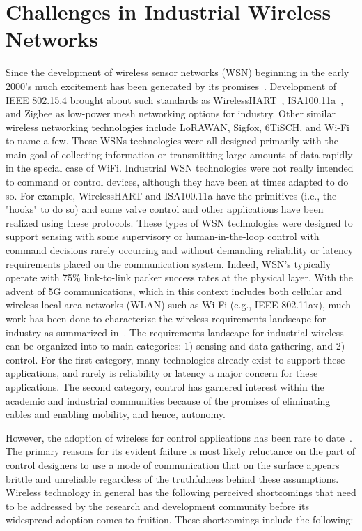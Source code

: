 \section{Challenges in Industrial Wireless Networks}
Since the development of wireless sensor networks (WSN) beginning in the early 2000's much excitement has been generated by its promises~\cite{OnWorld2014}.   Development of IEEE 802.15.4 brought about such standards as WirelessHART~\cite{Song2008}, ISA100.11a~\cite{ISA100.11a}, and Zigbee as low-power mesh networking options for industry.  Other similar wireless networking technologies include LoRAWAN, Sigfox, 6TiSCH, and Wi-Fi to name a few.  These WSNs technologies were all designed primarily with the main goal of collecting information or transmitting large amounts of data rapidly in the special case of WiFi.  Industrial WSN technologies were not really intended to command or control devices, although they have been at times adapted to do so.  For example, WirelessHART and ISA100.11a have the primitives (i.e., the "hooks" to do so) and some valve control and other applications have been realized using these protocols. These types of WSN technologies were designed to support sensing with some supervisory or human-in-the-loop control with command decisions rarely occurring and without demanding reliability or latency requirements placed on the communication system.  Indeed, WSN's typically operate with 75\% link-to-link packer success rates at the physical layer.  With the advent of 5G communications, which in this context includes both cellular and wireless local area networks (WLAN) such as Wi-Fi (e.g., IEEE 802.11ax), much work has been done to characterize the wireless requirements landscape for industry as summarized in~\cite{Montgomery2019}.  The requirements landscape for industrial wireless can be organized into to main categories: 1) sensing and data gathering, and 2) control.  For the first category, many technologies already exist to support these applications, and rarely is reliability or latency a major concern for these applications.  The second category, control has garnered interest within the academic and industrial communities because of the promises of eliminating cables and enabling mobility, and hence, autonomy.  

However, the adoption of wireless for control applications has been rare to date~\cite{Martinez2019}.  The primary reasons for its evident failure is most likely reluctance on the part of control designers to use a mode of communication that on the surface appears brittle and unreliable regardless of the truthfulness behind these assumptions.  Wireless technology in general has the following perceived shortcomings that need to be addressed by the research and development community before its widespread adoption comes to fruition.  These shortcomings include the following:

